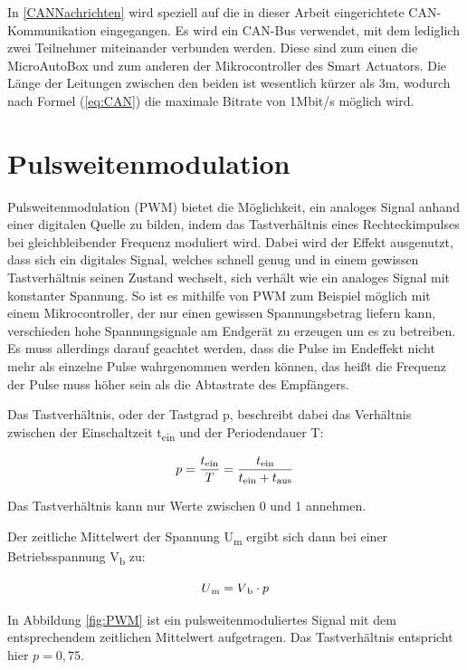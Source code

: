 In \autoref{CANNachrichten} wird speziell auf die in dieser Arbeit eingerichtete CAN-Kommunikation eingegangen. Es wird ein CAN-Bus verwendet, mit dem lediglich zwei Teilnehmer miteinander verbunden werden. Diese sind zum einen die MicroAutoBox und zum anderen der Mikrocontroller des Smart Actuators. Die Länge der Leitungen zwischen den beiden ist wesentlich kürzer als 3m, wodurch nach Formel (\ref{eq:CAN}) die maximale Bitrate von 1Mbit/s möglich wird.

\section{Pulsweitenmodulation}
Pulsweitenmodulation (PWM) bietet die Möglichkeit, ein analoges Signal anhand einer digitalen Quelle zu bilden, indem das Tastverhältnis eines Rechteckimpulses bei gleichbleibender Frequenz moduliert wird. Dabei wird der Effekt ausgenutzt, dass sich ein digitales Signal, welches schnell genug und in einem gewissen Tastverhältnis seinen Zustand wechselt, sich verhält wie ein analoges Signal mit konstanter Spannung. So ist es mithilfe von PWM zum Beispiel möglich mit einem Mikrocontroller, der nur einen gewissen Spannungsbetrag liefern kann, verschieden hohe Spannungsignale am Endgerät zu erzeugen um es zu betreiben. Es muss allerdings darauf geachtet werden, dass die Pulse im Endeffekt nicht mehr als einzelne Pulse wahrgenommen werden können, das heißt die Frequenz der Pulse muss höher sein als die Abtastrate des Empfängers.

Das Tastverhältnis, oder der Tastgrad p, beschreibt dabei das Verhältnis zwischen der Einschaltzeit t\textsubscript{ein} und der Periodendauer T:

\begin{equation}
	p=\frac{t\textsubscript{ein}}{T} = \frac{t\textsubscript{ein}}{t\textsubscript{ein}+t\textsubscript{aus}}
\end{equation}

Das Tastverhältnis kann nur Werte zwischen 0 und 1 annehmen.

Der zeitliche Mittelwert der Spannung U\textsubscript{m} ergibt sich dann bei einer Betriebsspannung V\textsubscript{b} zu:

\begin{equation}
	U\textsubscript{m}=V\textsubscript{b}\cdot p
\end{equation}

In Abbildung \ref{fig:PWM} ist ein pulsweitenmoduliertes Signal mit dem entsprechendem zeitlichen Mittelwert aufgetragen. Das Tastverhältnis entspricht hier $p=0,75$.

